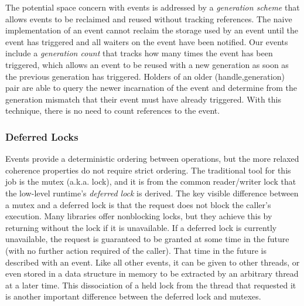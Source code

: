 The potential space concern with events is addressed by a {\em generation scheme}
that allows events to be reclaimed and reused without tracking references.  The
naive implementation of an event cannot reclaim the storage used by an event
until the event has triggered and all waiters on the event have been
notified.  
Our events include a
{\em generation count} that tracks how many times the event has been triggered,
which allows an event to be reused with a new generation as soon as the previous generation has triggered.
Holders of an older (handle,generation) pair are able to query the newer
incarnation of the event and determine from the generation mismatch that their
event must have already triggered.  With this technique, there is no need to
count references to the event. 

\subsubsection{Deferred Locks}
\label{subsec:defferedlocks}
Events provide a deterministic ordering between operations, 
but the more relaxed coherence properties do not require strict ordering.  
The traditional tool for this job is
the mutex (a.k.a. lock), and it is from the common reader/writer lock that
the low-level runtime's {\em deferred lock} is derived.  The key visible 
difference between a mutex and a deferred lock is that the request does not
block the caller's execution.  Many libraries offer nonblocking locks, but
they achieve this by returning without the lock if it is unavailable.  If
a deferred lock is currently unavailable, the request is guaranteed to be
granted at some time in the future (with no further action required of the 
caller).  That time in the future is described with an event.  Like all other
events, it can be given to other threads, or even stored
in a data structure in memory to be extracted by an arbitrary thread at a 
later time.  This dissociation of a held lock from the thread that
requested it is another important difference between the deferred lock and
mutexes.

